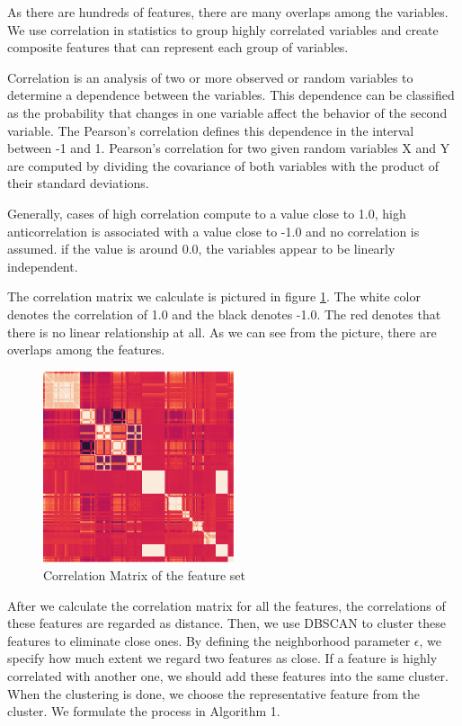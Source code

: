 \documentclass[5p]{elsarticle}
\begin{document}
As there are hundreds of features, there are many overlaps among the variables. We use correlation in statistics to group highly correlated variables and create composite features that can represent each group of variables.

Correlation is an analysis of two or more observed or random variables to determine a dependence between the variables. This dependence can be classified as the probability that changes in one variable affect the behavior of the second variable. The Pearson’s correlation defines this dependence in the interval between -1 and 1. Pearson’s correlation for two given random variables X and Y are computed by dividing the covariance of both variables with the product of their standard deviations.

Generally, cases of high correlation compute to a value close to 1.0, high anticorrelation is associated with a value close to -1.0 and no correlation is assumed. if the value is around 0.0, the variables appear to be linearly independent. 

The correlation matrix we calculate is pictured in figure \ref{fig:Correlation_matrix}. The white color denotes the correlation of 1.0 and the black denotes -1.0. The red denotes that there is no linear relationship at all. As we can see from the picture, there are overlaps among the features.

\begin{figure}[h]
    \centering
    \includegraphics[width=0.5\textwidth]{Correlation_Matrix.png}
    \caption{Correlation Matrix of the feature set}
    \label{fig:Correlation_matrix}
\end{figure}

After we calculate the correlation matrix for all the features, the correlations of these features are regarded as distance. Then, we use DBSCAN to cluster these features to eliminate close ones. By defining the neighborhood parameter $\epsilon$, we specify how much extent we regard two features as close. If a feature is highly correlated with another one, we should add these features into the same cluster. When the clustering is done, we choose the representative feature from the cluster. We formulate the process in Algorithm 1.
\end{document}
